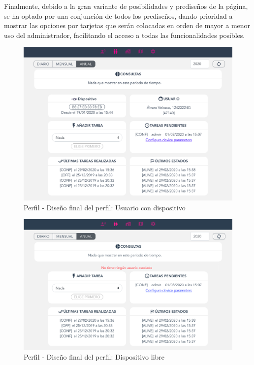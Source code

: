 \begin{enumerate}
    Finalmente, debido a la gran variante de posibilidades y prediseños de la página, se ha optado por una conjunción de todos los prediseños, dando prioridad a mostrar las opciones por tarjetas que serán colocadas en orden de mayor a menor uso del administrador, facilitando el acceso a todas las funcionalidades posibles.
    
    \begin{figure}[H]   
        \centering
        \includegraphics[width=12cm]{./img/web/perfil/stats.no-intents.png}
        \caption{Perfil - Diseño final del perfil: Usuario con dispositivo}
        \label{fig:perfil.dispositivoasignado.post}
    \end{figure}
    
    \begin{figure}[H]   
        \centering
        \includegraphics[width=12cm]{./img/web/perfil/stats.device.no-user.png}
        \caption{Perfil - Diseño final del perfil: Dispositivo libre}
        \label{fig:perfil.dispositivolibre.post}
    \end{figure}


\end{enumerate}
